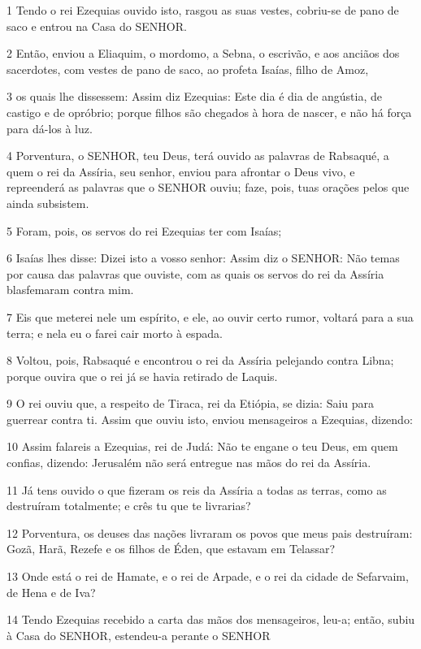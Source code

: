 \par 1 Tendo o rei Ezequias ouvido isto, rasgou as suas vestes, cobriu-se de pano de saco e entrou na Casa do SENHOR.
\par 2 Então, enviou a Eliaquim, o mordomo, a Sebna, o escrivão, e aos anciãos dos sacerdotes, com vestes de pano de saco, ao profeta Isaías, filho de Amoz,
\par 3 os quais lhe dissessem: Assim diz Ezequias: Este dia é dia de angústia, de castigo e de opróbrio; porque filhos são chegados à hora de nascer, e não há força para dá-los à luz.
\par 4 Porventura, o SENHOR, teu Deus, terá ouvido as palavras de Rabsaqué, a quem o rei da Assíria, seu senhor, enviou para afrontar o Deus vivo, e repreenderá as palavras que o SENHOR ouviu; faze, pois, tuas orações pelos que ainda subsistem.
\par 5 Foram, pois, os servos do rei Ezequias ter com Isaías;
\par 6 Isaías lhes disse: Dizei isto a vosso senhor: Assim diz o SENHOR: Não temas por causa das palavras que ouviste, com as quais os servos do rei da Assíria blasfemaram contra mim.
\par 7 Eis que meterei nele um espírito, e ele, ao ouvir certo rumor, voltará para a sua terra; e nela eu o farei cair morto à espada.
\par 8 Voltou, pois, Rabsaqué e encontrou o rei da Assíria pelejando contra Libna; porque ouvira que o rei já se havia retirado de Laquis.
\par 9 O rei ouviu que, a respeito de Tiraca, rei da Etiópia, se dizia: Saiu para guerrear contra ti. Assim que ouviu isto, enviou mensageiros a Ezequias, dizendo:
\par 10 Assim falareis a Ezequias, rei de Judá: Não te engane o teu Deus, em quem confias, dizendo: Jerusalém não será entregue nas mãos do rei da Assíria.
\par 11 Já tens ouvido o que fizeram os reis da Assíria a todas as terras, como as destruíram totalmente; e crês tu que te livrarias?
\par 12 Porventura, os deuses das nações livraram os povos que meus pais destruíram: Gozã, Harã, Rezefe e os filhos de Éden, que estavam em Telassar?
\par 13 Onde está o rei de Hamate, e o rei de Arpade, e o rei da cidade de Sefarvaim, de Hena e de Iva?
\par 14 Tendo Ezequias recebido a carta das mãos dos mensageiros, leu-a; então, subiu à Casa do SENHOR, estendeu-a perante o SENHOR
